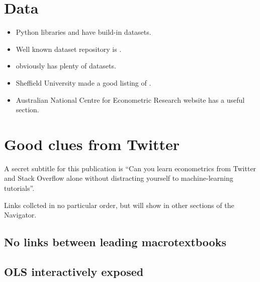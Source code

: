 \documentclass[letterpaper,10pt,english]{sphinxmanual}
\begin{document}
\chapter{Data}
\label{\detokenize{data::doc}}\label{\detokenize{data:data}}\begin{itemize}
\item {} 
Python libraries 
and  have
build-in datasets.

\item {} 
Well known dataset repository is .

\item {} 
 obviously has plenty of datasets.

\item {} 
Sheffield University made a good  listing of .

\item {} 
Australian National Centre for Econometric Research website has
a useful 
section.

\end{itemize}


\chapter{Good clues from Twitter}
\label{\detokenize{tweets::doc}}\label{\detokenize{tweets:good-clues-from-twitter}}
A secret subtitle for this publication is
“Can you learn econometrics from Twitter and Stack Overflow alone
without distracting yourself to machine-learning tutorials”.

Links collcted in no particular order, but will show in other sections of the Navigator.


\section{No links between leading macrotextbooks}
\label{\detokenize{tweets:no-links-between-leading-macrotextbooks}}



\section{OLS interactively exposed}
\label{\detokenize{tweets:ols-interactively-exposed}}
\end{document}
